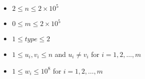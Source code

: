 \begin{itemize}
    \tightlist
    \item $2 \leq n \leq 2 \times 10 ^ 5$
    \item $0 \leq m \leq 2 \times 10 ^ 5$
    \item $1 \leq type \leq 2$
    \item $1 \leq u_i , v_i \leq n$ and $u_i \neq v_i$ for $i = 1, 2, \ldots, m$
    \item $1 \leq w_i \leq 10^8$ for $i = 1, 2, \ldots, m$
\end{itemize}
    
